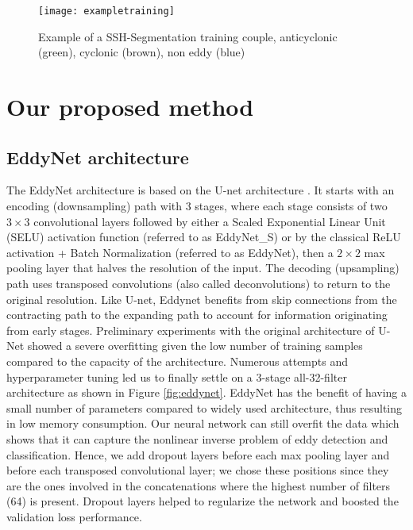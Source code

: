 \documentclass[journal]{IEEEtran}
\begin{document}
\begin{figure}[t]
\centering
\texttt{[image: exampletraining]}
\caption{Example of a SSH-Segmentation training couple, anticyclonic (green), cyclonic (brown), non eddy (blue)}
\label{fig:exampletraining}
\end{figure}

\section{Our proposed method}
\subsection{EddyNet architecture}
The EddyNet architecture is based on the U-net architecture \cite{ronneberger2015u}. It starts with an encoding (downsampling) path with 3 stages, where each stage consists of two $3\times 3$ convolutional layers followed by either a Scaled Exponential Linear Unit (SELU) activation function \cite{klambauer2017self} (referred to as EddyNet\_S) or by the classical ReLU activation + Batch Normalization (referred to as EddyNet), then a $2\times 2$ max pooling layer that halves the resolution of the input. The decoding (upsampling) path uses transposed convolutions (also called deconvolutions) \cite{zeiler2010deconvolutional} to return to the original resolution. Like U-net, Eddynet benefits from skip connections from the contracting path to the expanding path to account for information originating from early stages. Preliminary experiments with the original architecture of U-Net showed a severe overfitting given the low number of training samples compared to the capacity of the architecture. Numerous attempts and hyperparameter tuning led us to finally settle on a 3-stage all-32-filter architecture as shown in Figure \ref{fig:eddynet}. EddyNet has the benefit of having a small number of parameters compared to widely used architecture, thus resulting in low memory consumption. Our neural network can still overfit the data which shows that it can capture the nonlinear inverse problem of eddy detection and classification. Hence, we add dropout layers before each max pooling layer and before each transposed convolutional layer; we chose these positions since they are the ones involved in the concatenations where the highest number of filters (64) is present. Dropout layers helped to regularize the network and boosted the validation loss performance. 
\end{document}
